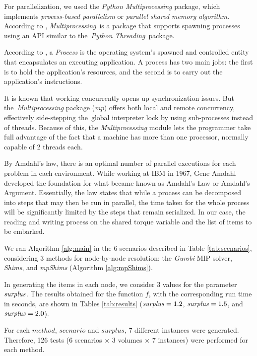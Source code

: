 \documentclass[preprint,authoryear]{elsarticle}
\begin{document}
For parallelization, we used the {\it Python Multiprocessing} package, which implements {\it process-based parallelism} or {\it parallel shared memory algorithm}. According to \cite{multiprocessing}, {\it Multiprocessing} is a package that supports spawning processes using an API similar to the {\it Python Threading} package.

According to \citet[p.271]{Breshears2009}, a {\it Process} is the operating system’s spawned and controlled entity that encapsulates an executing application. A process has two main jobs: the first is to hold the application's resources, and the second is to carry out the application's instructions. 

It is known that working concurrently opens up synchronization issues. But the {\it Multiprocessing} package ({\it mp}) offers both local and remote concurrency, effectively side-stepping the global interpreter lock by using sub-processes instead of threads. Because of this, the {\it Multiprocessing} module lets the programmer take full advantage of the fact that a machine has more than one processor, normally capable of 2 threads each.

By Amdahl's law, there is an optimal number of parallel executions for each problem in each environment. While working at IBM in 1967, Gene Amdahl developed the foundation for what became known as Amdahl's Law or Amdahl's Argument. Essentially, the law states that while a process can be decomposed into steps that may then be run in parallel, the time taken for the whole process will be significantly limited by the steps that remain serialized. In our case, the reading and writing process on the shared torque variable and the list of items to be embarked.

We ran Algorithm \ref{alg:main} in the 6 scenarios described in Table \ref{tab:scenarios}, considering 3 methods for node-by-node resolution: the {\it Gurobi} MIP solver, {\it Shims}, and {\it mpShims} (Algorithm \ref{alg:mpShims}).

In generating the items in each node, we consider 3 values for the parameter ${\it surplus}$. The results obtained for the function $f$, with the corresponding run time in seconds, are shown in Tables \ref{tab:results} (${\it surplus} = 1.2$, ${\it surplus} = 1.5$, and ${\it surplus} = 2.0$).

For each $method$, $scenario$ and $surplus$, 7 different instances were generated. Therefore, 126 tests (6 scenarios $\times$ 3 volumes $\times$ 7 instances) were performed for each method. 
\end{document}
